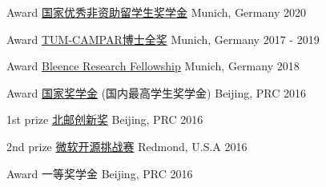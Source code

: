




\begin{cvhonors}

\cvhonor
{Award} %
{\href{}{国家优秀非资助留学生奖学金} } %
{Munich, Germany} %
{2020} %

\cvhonor
{Award} %
{\href{}{TUM-CAMPAR博士全奖} } %
{Munich, Germany} %
{2017 - 2019} %

\cvhonor
{Award} %
{\href{https://bleenco.com/}{Bleence Research Fellowship} } %
{Munich, Germany} %
{2018} %

\cvhonor
{Award} %
{\href{http://sice.bupt.edu.cn/info/1008/1546.htm}{国家奖学金} (国内最高学生奖学金)} %
{Beijing, PRC} %
{2016} %

\cvhonor
{1st prize} %
{\href{http://my.bupt.edu.cn/detach.portal?.pmn=view&action=browser&.ia=false&.pen=pe1144&bulletinId=fc089be9-6d81-11e6-ae27-4f4915a784ea}{北邮创新奖}} %
{Beijing, PRC} %
{2016} %


\cvhonor
{2nd prize} %
{\href{https://www.microsoft.com/en-us/research/academic-program/microsoft-open-source-challenge/}{微软开源挑战赛}} %
{Redmond, U.S.A} %
{2016} %


\cvhonor
{Award} %
{一等奖学金} %
{Beijing, PRC} %
{2016} %


\end{cvhonors}

